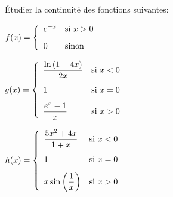 \documentclass[a4paper, 11pt,reqno]{article}
\begin{document}
\begin{exercice}  \;
	\'Etudier la continuit\'e des fonctions suivantes:
	\begin{enumerate}
		\begin{minipage}[t]{0.27\textwidth}
			\item $f(x)=\left\lbrace \begin{array}{ll}e^{-x}& \hbox{si}\ x>0\vsec\\ 0 &\hbox{sinon}  \end{array}\right.$
		\end{minipage}
		\begin{minipage}[t]{0.34\textwidth}
			\item $g(x)=\left\lbrace \begin{array}{ll} \ddp\frac{\ln{(1-4x)}}{2x}  & \hbox{si}\ x< 0\vsec\\ 1 &\hbox{si}\ x=0\vsec\\ \ddp\frac{e^x-1}{x} & \hbox{si}\ x>0  \end{array}\right.$
		\end{minipage}
		\begin{minipage}[t]{0.3\textwidth}
			\item $h(x)=\left\lbrace \begin{array}{ll} \ddp\frac{5x^2+4x}{1+x}  & \hbox{si}\ x< 0\vsec\\ 1 &\hbox{si}\ x=0\vsec\\ x\sin{\left( \ddp\frac{1}{x} \right)}& \hbox{si}\ x>0  \end{array}\right.$
		\end{minipage}
	\end{enumerate}
\end{exercice}
\end{document}
